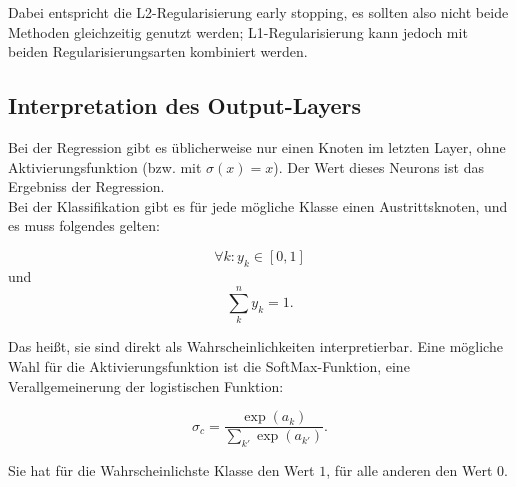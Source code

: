 Dabei entspricht die L2-Regularisierung early stopping, es sollten also nicht beide Methoden gleichzeitig genutzt werden; L1-Regularisierung kann jedoch mit beiden Regularisierungsarten kombiniert werden. \cite{bengio2012practical}

\subsection{Interpretation des Output-Layers}
Bei der Regression gibt es üblicherweise nur einen Knoten im letzten Layer, ohne Aktivierungsfunktion (bzw. mit $\sigma(x) = x$). Der Wert dieses Neurons ist das Ergebniss der Regression. \\

Bei der Klassifikation gibt es für jede mögliche Klasse einen Austrittsknoten, und es muss folgendes gelten:

\begin{equation}
 	\forall	k: y_k \in [0,1]
 \end{equation} 
 und 
 \begin{equation}
 	\sum_k^n y_k = 1.
 \end{equation}

Das heißt, sie sind direkt als Wahrscheinlichkeiten interpretierbar. Eine mögliche Wahl für die Aktivierungsfunktion ist die SoftMax-Funktion, eine Verallgemeinerung der logistischen Funktion:

\begin{equation}
	\sigma_c = \frac{\exp (a_k)}{\sum_{k'} \exp (a_{k'})}.
\end{equation}

Sie hat für die Wahrscheinlichste Klasse den Wert $1$, für alle anderen den Wert $0$. \cite{bishop1995neural}



